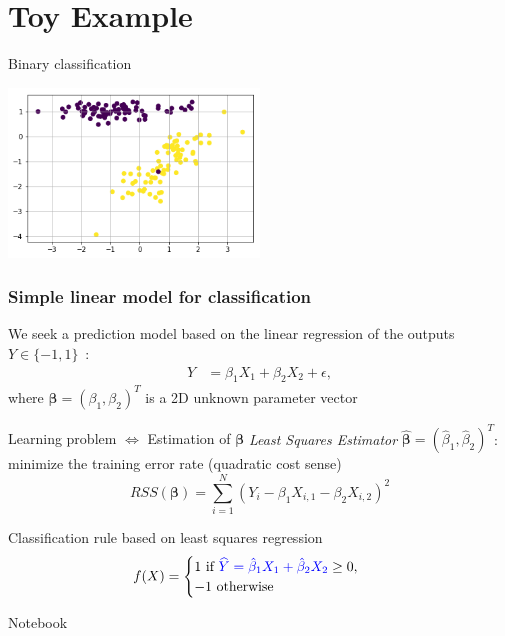 \documentclass[pressentation,9pt,aspectratio=1610,xcolor=table]{beamer}
\newcommand{\structuretext}[1]{{\textcolor{blue}{#1}}}
\begin{document}
\section{Toy Example}

\begin{frame}{Binary classification}
  \begin{center}
    \includegraphics[width=0.5\textwidth]{academic_linear.png}
  \end{center}
\end{frame}
  
\begin{frame}
  \frametitle{Simple linear model for classification}
  We seek a prediction model based on the linear regression of the outputs 
  $Y \in \{-1,1\}$~:
  \begin{align*}
    Y & = \beta_1 X_1 + \beta_2 X_2 + \epsilon,
  \end{align*}
  where $\boldsymbol{\beta}=(\beta_1, \beta_2)^T $ is a 2D unknown parameter vector 
  
  \begin{block}{Learning problem $\Leftrightarrow$ Estimation of $\boldsymbol{\beta}$}
    {\it Least Squares Estimator} $\hat{\boldsymbol{\beta}}=(\hat{\beta}_1, \hat{\beta}_2)^T $: 
    minimize the training error rate (quadratic cost sense)
    $$
    RSS ( \boldsymbol{\beta} )= \sum_{i=1}^N (Y_i - \beta_1 X_{i,1} - \beta_2 X_{i,2} )^2
    $$
  \end{block}
  
  
  \begin{block}{Classification rule based on least squares regression}
    \vspace{-2mm}
    \begin{align*}
      f(X) &= \begin{cases}
        1 \textrm{ if } \structuretext{\widehat{Y}= \hat{\beta}_1 X_1 + \hat{\beta}_2 X_2} \ge 0,\\
        -1 \textrm{ otherwise}
      \end{cases}
    \end{align*}
  \end{block}

  \alert{Notebook}
\end{frame}
  
\end{document}
